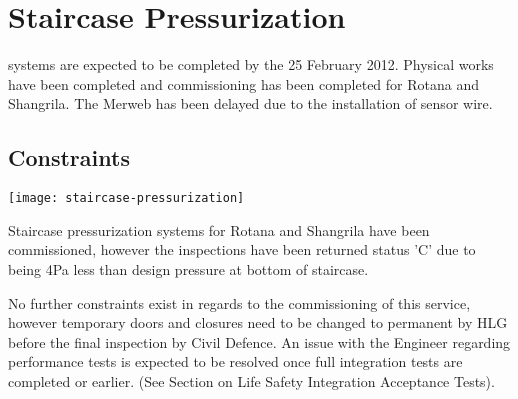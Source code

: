 
\chapter{Staircase Pressurization}
\label{pressurization}


 systems are expected to be completed by the 25 February 2012. Physical works have been completed and commissioning has been completed for Rotana and Shangrila. The Merweb has been delayed due to the installation of sensor wire. 

          

\section{Constraints}


\begin{marginfigure}
\texttt{[image: staircase-pressurization]}
\caption{Staircase pressurization systems for Rotana and Shangrila have been commissioned, however the inspections have been returned status 'C' due to being 4Pa less than design pressure at bottom of staircase.}
\end{marginfigure}


No further constraints exist in regards to the commissioning of this service, however temporary doors and closures need to be changed to permanent by HLG before the final inspection by Civil Defence. An issue with the Engineer regarding performance tests is expected to be resolved once full integration tests are completed or earlier. (See Section on Life Safety Integration Acceptance Tests).











